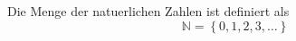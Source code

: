 Die Menge der natuerlichen Zahlen ist definiert als
$$\mathbb{N} = \left\{ 0, 1, 2, 3, \dots \right\}$$ 
